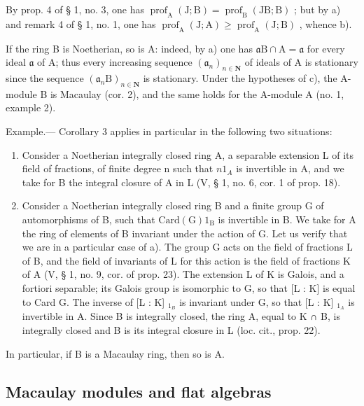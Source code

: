 By prop. 4 of § 1, no. 3, one has \(\operatorname{prof}_{\mathrm{A}}(\mathrm{J};\mathrm{B}) = \operatorname{prof}_{\mathrm{B}}(\mathrm{JB};\mathrm{B})\) ; but by a) and remark 4 of § 1, no. 1, one has \(\operatorname{prof}_{\mathrm{A}}(\mathrm{J};\mathrm{A}) \geqslant \operatorname{prof}_{\mathrm{A}}(\mathrm{J};\mathrm{B})\) , whence b).

If the ring B is Noetherian, so is A: indeed, by a) one has \(\mathfrak{a}\mathrm{B} \cap \mathrm{A} = \mathfrak{a}\) for every ideal \(\mathfrak{a}\) of A; thus every increasing sequence \((\mathfrak{a}_n)_{n \in \mathbf{N}}\) of ideals of A is stationary since the sequence \((\mathfrak{a}_n\mathrm{B})_{n \in \mathbf{N}}\) is stationary. Under the hypotheses of c), the A-module B is Macaulay (cor. 2), and the same holds for the A-module A (no. 1, example 2).

Example.--- Corollary 3 applies in particular in the following two situations:

\begin{enumerate}
\def\labelenumi{\alph{enumi})}
\item
  Consider a Noetherian integrally closed ring A, a separable extension L of its field of fractions, of finite degree n such that \(n1_{A}\) is invertible in A, and we take for B the integral closure of A in L (V, § 1, no. 6, cor. 1 of prop. 18).
\item
  Consider a Noetherian integrally closed ring B and a finite group G of automorphisms of B, such that \(\mathrm{Card(G)1_B}\) is invertible in B. We take for A the ring of elements of B invariant under the action of G. Let us verify that we are in a particular case of a). The group G acts on the field of fractions L of B, and the field of invariants of L for this action is the field of fractions K of A (V, § 1, no. 9, cor. of prop. 23). The extension L of K is Galois, and a fortiori separable; its Galois group is isomorphic to G, so that {[}L : K{]} is equal to Card G. The inverse of {[}L : K{]} \(_{1_{B}}\) is invariant under G, so that {[}L : K{]} \(_{1_{A}}\) is invertible in A. Since B is integrally closed, the ring A, equal to K ∩ B, is integrally closed and B is its integral closure in L (loc. cit., prop. 22).
\end{enumerate}

In particular, if B is a Macaulay ring, then so is A.

\subsection{Macaulay modules and flat algebras}

